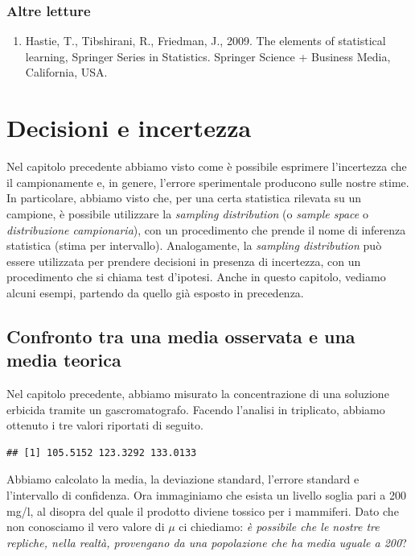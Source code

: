 \documentclass[a4paper,12pt,oneside]{book}
\providecommand{\tightlist}{%
  \setlength{\itemsep}{0pt}\setlength{\parskip}{0pt}}
\begin{document}
\hypertarget{altre-letture-1}{%
\subsection{Altre letture}\label{altre-letture-1}}

\begin{enumerate}
\def\labelenumi{\arabic{enumi}.}
\tightlist
\item
  Hastie, T., Tibshirani, R., Friedman, J., 2009. The elements of statistical learning, Springer Series in Statistics. Springer Science + Business Media, California, USA.
\end{enumerate}

\hypertarget{decisioni-e-incertezza}{%
\chapter{Decisioni e incertezza}\label{decisioni-e-incertezza}}

Nel capitolo precedente abbiamo visto come è possibile esprimere l'incertezza che il campionamente e, in genere, l'errore sperimentale producono sulle nostre stime. In particolare, abbiamo visto che, per una certa statistica rilevata su un campione, è possibile utilizzare la \emph{sampling distribution} (o \emph{sample space} o \emph{distribuzione campionaria}), con un procedimento che prende il nome di inferenza statistica (stima per intervallo). Analogamente, la \emph{sampling distribution} può essere utilizzata per prendere decisioni in presenza di incertezza, con un procedimento che si chiama test d'ipotesi. Anche in questo capitolo, vediamo alcuni esempi, partendo da quello già esposto in precedenza.

\hypertarget{confronto-tra-una-media-osservata-e-una-media-teorica}{%
\section{Confronto tra una media osservata e una media teorica}\label{confronto-tra-una-media-osservata-e-una-media-teorica}}

Nel capitolo precedente, abbiamo misurato la concentrazione di una soluzione erbicida tramite un gascromatografo. Facendo l'analisi in triplicato, abbiamo ottenuto i tre valori riportati di seguito.

\begin{verbatim}
## [1] 105.5152 123.3292 133.0133
\end{verbatim}

Abbiamo calcolato la media, la deviazione standard, l'errore standard e l'intervallo di confidenza. Ora immaginiamo che esista un livello soglia pari a 200 mg/l, al disopra del quale il prodotto diviene tossico per i mammiferi. Dato che non conosciamo il vero valore di \(\mu\) ci chiediamo: \emph{è possibile che le nostre tre repliche, nella realtà, provengano da una popolazione che ha media uguale a 200}?
\end{document}
